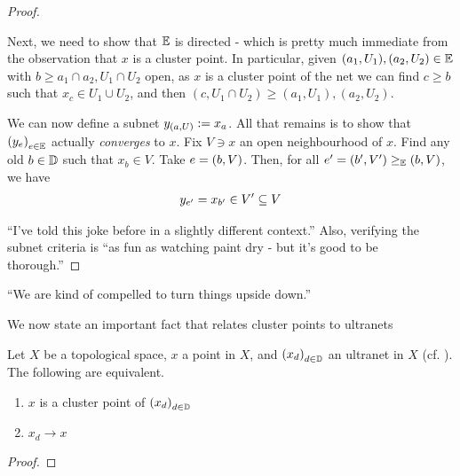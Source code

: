 \begin{proof}
\begin{description}
        Next, we need to show that $\mathbb{E}$ is directed - which is pretty much immediate from the observation that $x$ is a cluster point. In particular, given $(a_1, U_1), (a_2, U_2)\in \mathbb{E}$ with $b\geq a_1\cap a_2, U_1\cap U_2$ open, as $x$ is a cluster point of the net we can find $c\geq b$ such that $x_c\in U_1\cup U_2$, and then $(c, U_1\cap U_2)\geq (a_1, U_1), (a_2, U_2)$.

        We can now define a subnet $y_{\left( a, U \right)} := x_a$. All that remains is to show that $\left( y_e \right)_{e \in \mathbb{E}}$ actually \textit{converges} to $x$. Fix $V \ni x$ an open neighbourhood of $x$. Find any old $b \in \mathbb{D}$ such that $x_b \in V$. Take $e = \left( b, V \right)$. Then, for all $e' = \left( b', V' \right) \geq_{\mathbb{E}} \left( b, V \right)$, we have
        \begin{align*}
            y_{e'} = x_{b'} \in V' \subseteq V
        \end{align*}

    \end{description}``I've told this joke before in a slightly different context.'' Also, verifying the subnet criteria is
    ``as fun as watching paint dry - but it's good to be thorough.''
\end{proof}
``We are kind of compelled to turn things upside down.''

We now state an important fact that relates cluster points to ultranets

\begin{boxproposition}\label{Ch2:Prop:ofUltraNet_clusterPt_iff_tendsTo}
    Let $X$ be a topological space, $x$ a point in $X$, and $\left( x_d \right)_{d \in \mathbb{D}}$ an ultranet in $X$ (cf. ). The following are equivalent.
    \begin{enumerate}[label = (\arabic*)]
        \item $x$ is a cluster point of $\left( x_d \right)_{d \in \mathbb{D}}$
        \item $x_d \to x$
    \end{enumerate}
\end{boxproposition}
\begin{proof}
    \sorry
\end{proof}

